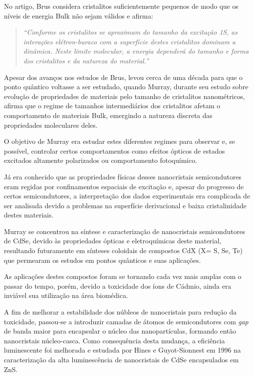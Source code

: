 \par No artigo\cite{introducao3}, Brus considera cristalitos suficientemente pequenos de modo que os níveis de energia Bulk não sejam válidos e afirma:

\begin{quote}
\textit{“Conforme os cristalitos se aproximam do tamanho da excitação 1S, as interações elétron-buraco com a superfície destes cristalitos dominam a dinâmica. Neste limite molecular, a energia dependerá do tamanho e forma dos cristalitos e da natureza do material.”}
\end{quote}

\par Apesar dos avanços nos estudos de Brus, levou cerca de uma década para que o ponto quântico voltasse a ser estudado, quando Murray\cite{introducao4}, durante seu estudo sobre evolução de propriedades de materiais pelo tamanho de cristalitos nanométricos, afirma que o regime de tamanhos intermediários dos cristalitos afetam o comportamento de materiais Bulk, emergindo a natureza discreta das propriedades moleculares deles.

\par O objetivo de Murray era estudar estes diferentes regimes para observar e, se possível, controlar certos comportamentos como efeitos ópticos de estados excitados altamente polarizados ou comportamento fotoquímico.

\par Já era conhecido que as propriedades físicas desses nanocristais semicondutores eram regidas por confinamentos espaciais de excitação e, apesar do progresso de certos semicondutores, a interpretação dos dados experimentais era complicada de ser analisada devido a problemas na superfície derivacional e baixa cristalinidade destes materiais.
     
\par Murray se concentrou na síntese e caracterização de nanocristais semicondutores de CdSe, devido às propriedades ópticas e eletroquímicas deste material, resultando futuramente em sínteses coloidais de compostos CdX (X= S, Se, Te) que permearam os estudos em pontos quânticos e suas aplicações.

\par As aplicações destes compostos foram se tornando cada vez mais amplas com o passar do tempo, porém, devido a toxicidade dos íons de Cádmio, ainda era inviável sua utilização na área biomédica.

\par A fim de melhorar a estabilidade dos núbleos de nanocristais para redução da toxicidade, passou-se a introduzir camadas de átomos de semicondutores com \textit{gap} de banda maior para encapsular o núcleo das nanopartículas, formando então nanocristais núcleo-casca. Como consequência desta mudança, a eficiência luminescente foi melhorada e estudada por Hines e Guyot-Sionnest em 1996 na caracterização da alta luminescência de nanocristais de CdSe encapsulados em ZnS.

